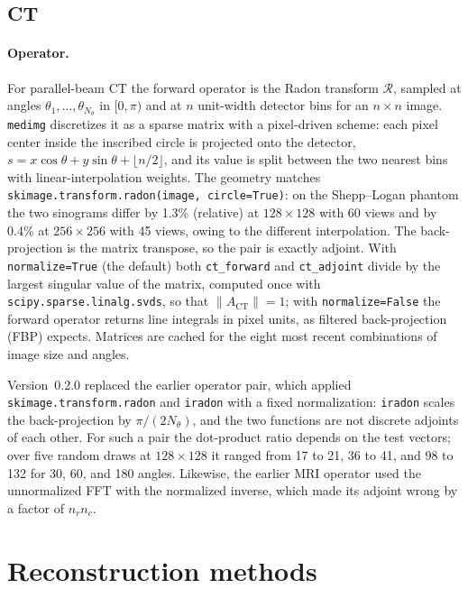 \documentclass[11pt,a4paper]{article}
\newcommand{\code}[1]{\texttt{#1}}
\newcommand{\R}{\mathcal R}
\begin{document}
\subsection{CT}

\paragraph{Operator.} For parallel-beam CT the forward operator is the Radon
transform $\R$, sampled at angles $\theta_1,\dots,\theta_{N_\theta}$ in
$[0,\pi)$ and at $n$ unit-width detector bins for an $n\times n$ image.
\texttt{medimg} discretizes it as a sparse matrix with a pixel-driven
scheme: each pixel center inside the inscribed circle is projected onto the
detector, $s = x\cos\theta + y\sin\theta + \lfloor n/2\rfloor$, and its value
is split between the two nearest bins with linear-interpolation weights.
The geometry matches \code{skimage.transform.radon(image, circle=True)}: on
the Shepp--Logan phantom the two sinograms differ by 1.3\% (relative) at
$128\times128$ with 60 views and by 0.4\% at $256\times256$ with 45 views,
owing to the different interpolation. The back-projection is the matrix
transpose, so the pair is exactly adjoint. With \code{normalize=True} (the
default) both \code{ct\_forward} and \code{ct\_adjoint} divide by the largest
singular value of the matrix, computed once with
\code{scipy.sparse.linalg.svds}, so that $\|A_{\mathrm{CT}}\|=1$; with
\code{normalize=False} the forward operator returns line integrals in pixel
units, as filtered back-projection (FBP) expects. Matrices are cached for the
eight most recent combinations of image size and angles.

Version~0.2.0 replaced the earlier operator pair, which applied
\code{skimage.transform.radon} and \code{iradon} with a fixed normalization:
\code{iradon} scales the back-projection by $\pi/(2N_\theta)$, and the two
functions are not discrete adjoints of each other. For such a pair the
dot-product ratio depends on the test vectors; over five random draws at
$128\times128$ it ranged from 17 to 21, 36 to 41, and 98 to 132 for 30, 60,
and 180 angles. Likewise, the earlier
MRI operator used the unnormalized FFT with the normalized inverse, which made
its adjoint wrong by a factor of $n_rn_c$.

\section{Reconstruction methods}
\end{document}
